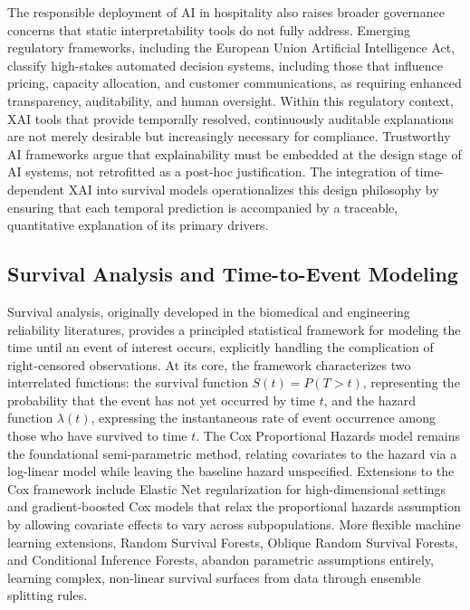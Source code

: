 \documentclass[pdflatex,iicol,sn-mathphys-ay]{sn-jnl}
\theoremstyle{thmstyleone}%
\theoremstyle{thmstyletwo}%
\theoremstyle{thmstylethree}%
\begin{document}
The responsible deployment of AI in hospitality also raises broader governance concerns that static interpretability tools do not fully address. Emerging regulatory frameworks, including the European Union Artificial Intelligence Act, classify high-stakes automated decision systems, including those that influence pricing, capacity allocation, and customer communications, as requiring enhanced transparency, auditability, and human oversight. Within this regulatory context, XAI tools that provide temporally resolved, continuously auditable explanations are not merely desirable but increasingly necessary for compliance. Trustworthy AI frameworks \citep{thiebes2021trustworthy, meske2022explainable} argue that explainability must be embedded at the design stage of AI systems, not retrofitted as a post-hoc justification. The integration of time-dependent XAI into survival models operationalizes this design philosophy by ensuring that each temporal prediction is accompanied by a traceable, quantitative explanation of its primary drivers.

\subsection{Survival Analysis and Time-to-Event Modeling}

Survival analysis, originally developed in the biomedical and engineering reliability literatures, provides a principled statistical framework for modeling the time until an event of interest occurs, explicitly handling the complication of right-censored observations. At its core, the framework characterizes two interrelated functions: the survival function $S(t) = P(T > t)$, representing the probability that the event has not yet occurred by time $t$, and the hazard function $\lambda(t)$, expressing the instantaneous rate of event occurrence among those who have survived to time $t$. The Cox Proportional Hazards model \citep{kleinbaum2012survival} remains the foundational semi-parametric method, relating covariates to the hazard via a log-linear model while leaving the baseline hazard unspecified. Extensions to the Cox framework include Elastic Net regularization for high-dimensional settings and gradient-boosted Cox models that relax the proportional hazards assumption by allowing covariate effects to vary across subpopulations. More flexible machine learning extensions, Random Survival Forests, Oblique Random Survival Forests, and Conditional Inference Forests, abandon parametric assumptions entirely, learning complex, non-linear survival surfaces from data through ensemble splitting rules.
\end{document}
